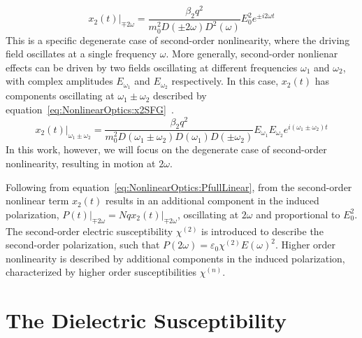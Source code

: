 \begin{equation}
	x_{2}(t)\vert_{\mp 2\omega} = \frac{\beta_2 q^2}{m_{0}^2 D(\pm 2\omega) D^{2}(\omega)} E_0^2 e^{\pm i 2\omega t}
\end{equation}
This is a specific degenerate case of second-order nonlinearity, where the driving field oscillates at a single frequency $\omega$. More generally, second-order nonlienar effects can be driven by two fields oscillating at different frequencies $\omega_1$ and $\omega_2$, with complex amplitudes $E_{\omega_1}$ and  $E_{\omega_2}$ respectively. In this case, $x_{2}(t)$ has components oscillating at $\omega_1 \pm \omega_2$ described by equation~\ref{eq:NonlinearOptics:x2SFG}~\cite[\S 1.4.1]{Boyd2008a}.
\begin{equation}\label{eq:NonlinearOptics:x2SFG}
	x_{2}(t)\vert_{\omega_1 \pm \omega_2} = \frac{\beta_2 q^2}{m_{0}^2 D(\omega_1 \pm \omega_2) D(\omega_1) D(\pm\omega_2)} E_{\omega_1} E_{\omega_2} e^{i (\omega_1 \pm \omega_2) t}
\end{equation}
In this work, however, we will focus on the degenerate case of second-order nonlinearity, resulting in motion at $2\omega$.

Following from equation~\ref{eq:NonlinearOptics:PfullLinear}, from  the second-order nonlinear term $x_{2}(t)$ results in an additional component in the induced polarization, $P(t)\vert_{\mp 2\omega} = N q x_{2}(t)\vert_{\mp 2\omega}$, oscillating at $2\omega$ and proportional to $E_0^2$. The second-order electric susceptibility $\chi^{(2)}$ is introduced to describe the second-order polarization, such that $P(2\omega) = \varepsilon_0 \chi^{(2)} E(\omega)^2$. Higher order nonlinearity is described by additional components in the induced polarization, characterized by higher order susceptibilities $\chi^{(n)}$.

\section{The Dielectric Susceptibility}\label{sec:background:NonlinearOptics:susceptibility}


